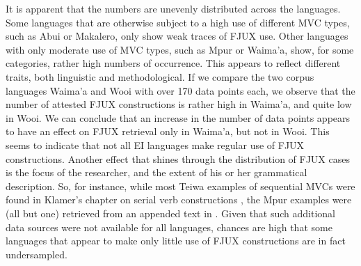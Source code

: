 It is apparent that the numbers are unevenly distributed across the languages. Some languages that are otherwise subject to a high use of different MVC types, such as Abui or Makalero, only show weak traces of FJUX use. Other languages with only moderate use of MVC types, such as Mpur or Waima'a, show, for some categories, rather high numbers of occurrence. This appears to reflect different traits, both linguistic and methodological. If we compare the two corpus languages Waima'a and Wooi with over 170 data points each, we observe that the number of attested FJUX constructions is rather high in Waima'a, and quite low in Wooi. We can conclude that an increase in the number of data points appears to have an effect on FJUX retrieval only in Waima'a, but not in Wooi. This seems to indicate that not all EI languages make regular use of FJUX constructions. Another effect that shines through the distribution of FJUX cases is the focus of the researcher, and the extent of his or her grammatical description. So, for instance, while most Teiwa examples of sequential MVCs were found in Klamer's chapter on serial verb constructions \citep{klamer2010grammar}, the Mpur examples were (all but one) retrieved from an appended text in \citet{ode2002sketch}. Given that such additional data sources were not available for all languages, chances are high that some languages that appear to make only little use of FJUX constructions are in fact undersampled.

